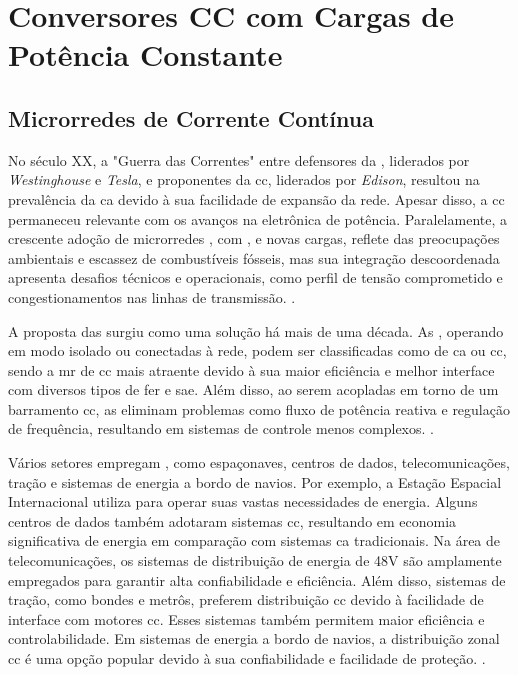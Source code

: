 \chapter{Conversores CC com Cargas de Potência Constante} \label{cap3}

\section{Microrredes de Corrente Contínua}

No século XX, a "Guerra das Correntes" entre defensores da , liderados por \textit{Westinghouse} e \textit{Tesla}, e proponentes da \acrshort{cc}, liderados por \textit{Edison}, resultou na prevalência da \acrshort{ca} devido à sua facilidade de expansão da rede. Apesar disso, a \acrshort{cc} permaneceu relevante com os avanços na eletrônica de potência. Paralelamente, a crescente adoção de microrredes , com ,  e novas cargas, reflete das preocupações ambientais e escassez de combustíveis fósseis, mas sua integração descoordenada apresenta desafios técnicos e operacionais, como perfil de tensão comprometido e congestionamentos nas linhas de transmissão. \cite{Elsayed2015, Dragicevic2015}.

A proposta das  surgiu como uma solução há mais de uma década. As , operando em modo isolado ou conectadas à rede, podem ser classificadas como  de \acrshort{ca} ou \acrshort{cc}, sendo a \acrshort{mr} de \acrshort{cc} mais atraente devido à sua maior eficiência e melhor interface com diversos tipos de \acrshort{fer} e \acrshort{sae}. Além disso, ao serem acopladas em torno de um barramento \acrshort{cc}, as  eliminam problemas como fluxo de potência reativa e regulação de frequência, resultando em sistemas de controle menos complexos. \cite{Dragicevic2015}.

Vários setores empregam , como espaçonaves, centros de dados, telecomunicações, tração e sistemas de energia a bordo de navios. Por exemplo, a Estação Espacial Internacional utiliza  para operar suas vastas necessidades de energia. Alguns centros de dados também adotaram sistemas \acrshort{cc}, resultando em economia significativa de energia em comparação com sistemas \acrshort{ca} tradicionais. Na área de telecomunicações, os sistemas de distribuição de energia de 48V são amplamente empregados para garantir alta confiabilidade e eficiência. Além disso, sistemas de tração, como bondes e metrôs, preferem distribuição \acrshort{cc} devido à facilidade de interface com motores \acrshort{cc}. Esses sistemas também permitem maior eficiência e controlabilidade. Em sistemas de energia a bordo de navios, a distribuição zonal \acrshort{cc} é uma opção popular devido à sua confiabilidade e facilidade de proteção. \cite{Elsayed2015}.

